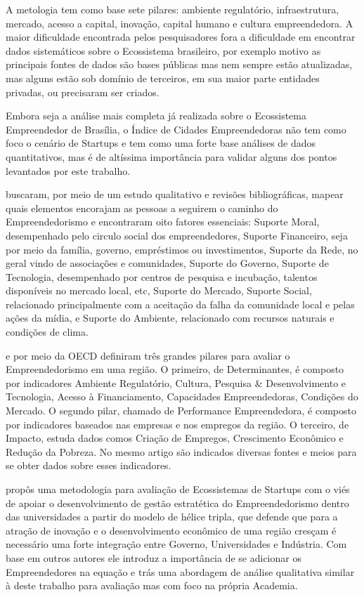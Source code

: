 A metologia tem como base sete pilares: ambiente regulatório, infraestrutura, mercado, acesso a capital, inovação, capital humano e cultura empreendedora. A maior dificuldade encontrada pelos pesquisadores fora a dificuldade em encontrar dados sistemáticos sobre o Ecossistema brasileiro, por exemplo motivo as principais fontes de dados são bases públicas mas nem sempre estão atualizadas, mas alguns estão sob domínio de terceiros, em sua maior parte entidades privadas, ou precisaram ser criados. 

Embora seja a análise mais completa já realizada sobre o Ecossistema Empreendedor de Brasília, o Índice de Cidades Empreendedoras não tem como foco o cenário de Startups e tem como uma forte base análises de dados quantitativos, mas é de altíssima importância para validar alguns dos pontos levantados por este trabalho.

 buscaram, por meio de um estudo qualitativo e revisões bibliográficas, mapear quais elementos encorajam as pessoas a seguirem o caminho do Empreendedorismo e encontraram oito fatores essenciais: Suporte Moral, desempenhado pelo circulo social dos empreendedores, Suporte Financeiro, seja por meio da família, governo, empréstimos ou investimentos, Suporte da Rede, no geral vindo de associações e comunidades, Suporte do Governo, Suporte de Tecnologia, desempenhado por centros de pesquisa e incubação, talentos disponíveis no mercado local, etc, Suporte do Mercado, Suporte Social, relacionado principalmente com a aceitação da falha da comunidade local e pelas ações da mídia, e Suporte do Ambiente, relacionado com recursos naturais e condições de clima.

 e  por meio da OECD definiram três grandes pilares para avaliar o Empreendedorismo em uma região. O primeiro, de Determinantes, é composto por indicadores Ambiente Regulatório, Cultura, Pesquisa \& Desenvolvimento e Tecnologia, Acesso à Financiamento, Capacidades Empreendedoras, Condições do Mercado. O segundo pilar, chamado de Performance Empreendedora, é composto por indicadores baseados nas empresas e nos empregos da região. O terceiro, de Impacto, estuda dados comos Criação de Empregos, Crescimento Econômico e Redução da Pobreza. No mesmo artigo são indicados diversas fontes e meios para se obter dados sobre esses indicadores.

 propôs uma metodologia para avaliação de Ecossistemas de Startups com o viés de apoiar o desenvolvimento de gestão estratética do Empreendedorismo dentro das universidades a partir do modelo de hélice tripla, que defende que para a atração de inovação e o desenvolvimento econômico de uma região cresçam é necessário uma forte integração entre Governo, Universidades e Indústria. Com base em outros autores ele introduz a importância de se adicionar os Empreendedores na equação e trás uma abordagem de análise qualitativa similar à deste trabalho para avaliação mas com foco na própria Academia.

